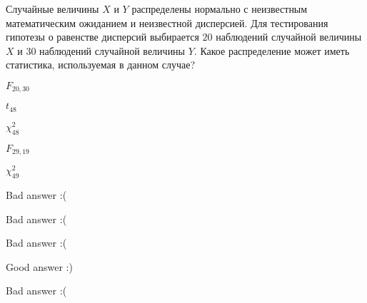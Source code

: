
\begin{question}
Случайные величины \(X\) и \(Y\) распределены нормально с неизвестным
математическим ожиданием и неизвестной дисперсией. Для тестирования
гипотезы о равенстве дисперсий выбирается \(20\) наблюдений случайной
величины \(X\) и \(30\) наблюдений случайной величины \(Y\). Какое
распределение может иметь статистика, используемая в данном случае?
\begin{answerlist}
  \item \(F_{20,30}\)
  \item \(t_{48}\)
  \item \(\chi^2_{48}\)
  \item \(F_{29,19}\)
  \item \(\chi^2_{49}\)
\end{answerlist}
\end{question}

\begin{solution}
\begin{answerlist}
  \item Bad answer :(
  \item Bad answer :(
  \item Bad answer :(
  \item Good answer :)
  \item Bad answer :(
\end{answerlist}
\end{solution}

